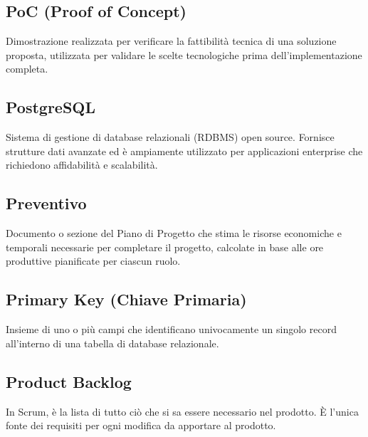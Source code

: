 \documentclass[a4paper, 11pt, oneside]{scrartcl} %
\begin{document}
\subsection*{PoC (Proof of Concept)}


Dimostrazione realizzata per verificare la fattibilità tecnica di una soluzione proposta, utilizzata per validare le scelte tecnologiche prima dell'implementazione completa.

\vspace{0.5cm}

\subsection*{PostgreSQL}


Sistema di gestione di database relazionali (RDBMS) open source. Fornisce strutture dati avanzate ed è ampiamente utilizzato per applicazioni enterprise che richiedono affidabilità e scalabilità.

\vspace{0.5cm}

\subsection*{Preventivo}
Documento o sezione del Piano di Progetto che stima le risorse economiche e temporali necessarie per completare il progetto, calcolate in base alle ore produttive pianificate per ciascun ruolo.
\vspace{0.5cm}

\subsection*{Primary Key (Chiave Primaria)}
Insieme di uno o più campi che identificano univocamente un singolo record all'interno di una tabella di database relazionale.
\vspace{0.5cm}

\subsection*{Product Backlog}
In Scrum, è la lista di tutto ciò che si sa essere necessario nel prodotto. È l'unica fonte dei requisiti per ogni modifica da apportare al prodotto.
\vspace{0.5cm}
\end{document}
